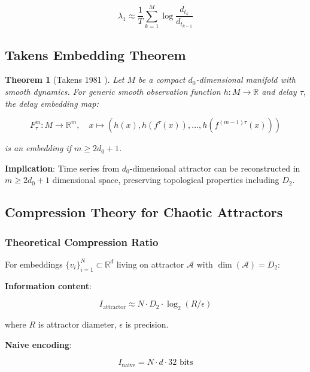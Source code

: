 \documentclass[11pt,a4paper]{article}
\newtheorem{theorem}{Theorem}
\begin{document}
\begin{equation}
\lambda_1 \approx \frac{1}{T} \sum_{k=1}^M \log \frac{d_{t_k}}{d_{t_{k-1}}}
\end{equation}

\subsection{Takens Embedding Theorem}

\begin{theorem}[Takens 1981 \cite{takens1981detecting}]
Let $M$ be a compact $d_0$-dimensional manifold with smooth dynamics. For generic smooth observation function $h: M \to \mathbb{R}$ and delay $\tau$, the delay embedding map:

\begin{equation}
F_\tau^m: M \to \mathbb{R}^m, \quad x \mapsto (h(x), h(f^\tau(x)), \ldots, h(f^{(m-1)\tau}(x)))
\end{equation}

is an embedding if $m \geq 2d_0 + 1$.
\end{theorem}

\textbf{Implication}: Time series from $d_0$-dimensional attractor can be reconstructed in $m \geq 2d_0 + 1$ dimensional space, preserving topological properties including $D_2$.

\subsection{Compression Theory for Chaotic Attractors}

\subsubsection{Theoretical Compression Ratio}

For embeddings $\{v_i\}_{i=1}^N \subset \mathbb{R}^d$ living on attractor $\mathcal{A}$ with $\dim(\mathcal{A}) = D_2$:

\textbf{Information content}:

\begin{equation}
I_{\text{attractor}} \approx N \cdot D_2 \cdot \log_2(R/\epsilon)
\end{equation}

where $R$ is attractor diameter, $\epsilon$ is precision.

\textbf{Naive encoding}:

\begin{equation}
I_{\text{naive}} = N \cdot d \cdot 32 \text{ bits}
\end{equation}
\end{document}
